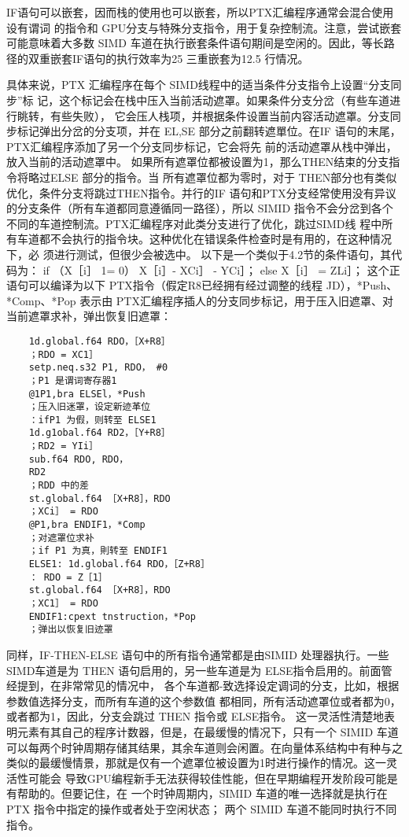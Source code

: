 IF语句可以嵌套，因而栈的使用也可以嵌套，所以PTX汇编程序通常会混合使用设有谓词
的指令和 GPU分支与特殊分支指令，用于复杂控制流。注意，尝试嵌套可能意味着大多数 SIMD
车道在执行嵌套条件语句期间是空闲的。因此，等长路径的双重嵌套IF语句的执行效率为25%
三重嵌套为12.5%
行情况。

具体来说，PTX 汇编程序在每个 SIMD线程中的适当条件分支指令上设置“分支同步”标
记，这个标记会在栈中压入当前活动遮罩。如果条件分支分岔（有些车道进行眺转，有些失败），
它会压人栈项，并根据条件设置当前内容活动遮罩。分支同步标记弹出分岔的分支项，并在 EL,SE
部分之前翻转遮單位。在IF 语句的末尾，PTX汇编程序添加了另一个分支同步标记，它会将先
前的活动遮罩从栈中弹出，放入当前的活动遮罩中。
如果所有遮罩位都被设置为1，那么THEN结束的分支指令将略过ELSE 部分的指令。当
所有遮罩位都为零时，对于 THEN部分也有类似优化，条件分支将跳过THEN指令。并行的IF
语句和PTX分支经常使用没有异议的分支条件（所有车道都同意遵循同一路径），所以 SIMID
指令不会分岔到各个不同的车道控制流。PTX汇编程序对此类分支进行了优化，跳过SIMD线
程中所有车道都不会执行的指令块。这种优化在错误条件检查时是有用的，在这种情况下，必
须进行测试，但很少会被选中。
以下是一个类似于4.2节的条件语句，其代码为：
if （X［i］ 1= 0）
X［i］- XCi］ - YCi］；
else X［i］ = ZLi］；
这个正语句可以编译为以下 PTX指令（假定R8已经拥有经过调整的线程 JD），*Push、*Comp、*Pop
表示由 PTX汇编程序插人的分支同步标记，用于压入旧遮罩、对当前遮罩求补，弹出恢复旧遮罩：
\begin{verbatim}
    1d.global.f64 RDO，［X+R8］
    ；RDO = XC1］
    setp.neq.s32 P1, RDO， #0
    ；P1 是谓词寄存器1
    @1P1,bra ELSEl，*Push
    ；压入旧迷罩，设定新迹革位
    ：ifP1 为假，则转至 ELSE1
    1d.g1obal.f64 RD2，［Y+R8］
    ；RD2 = YIi］
    sub.f64 RDO, RDO，
    RD2
    ；RDD 中的差
    st.global.f64 ［X+R8］，RDO
    ；XCi］ = RDO
    @P1,bra ENDIF1，*Comp
    ；对遮罩位求补
    ；if P1 为真，則转至 ENDIF1
    ELSE1: 1d.global.f64 RDO，［Z+R8］
    ： RDO = Z［1］
    st.global.f64 ［X+R8］，RDO
    ；XC1］ = RDO
    ENDIF1:cpext tnstruction，*Pop
    ；弹出以恢复旧迹罩
\end{verbatim}
同样，IF-THEN-ELSE 语句中的所有指令通常都是由SIMID 处理器执行。一些SIMD车道是为
THEN 语句启用的，另一些车道是为 ELSE指令启用的。前面管经提到，在非常常见的情况中，
各个车道都-致选择设定调词的分支，比如，根据参数值选择分支，而所有车道的这个参数值
都相同，所有活动遮罩位或者都为0，或者都为1，因此，分支会跳过 THEN 指令或 ELSE指令。
这一灵活性清楚地表明元素有其自己的程序计数器，但是，在最缓慢的情况下，只有一个
SIMID 车道可以每两个时钟周期存储其结果，其余车道则会闲置。在向量体系结构中有种与之
类似的最缓慢情景，那就是仅有一个遮罩位被设置为1时进行操作的情况。这一灵活性可能会
导致GPU编程新手无法获得较佳性能，但在早期编程开发阶段可能是有帮助的。但要记住，在
一个时钟周期内，SIMID 车道的唯一选择就是执行在PTX 指令中指定的操作或者处于空闲状态；
两个 SIMID 车道不能同时执行不同指令。

